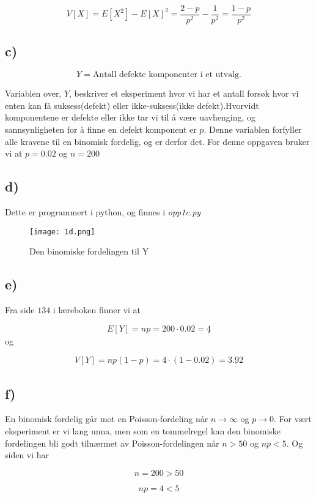 \documentclass[a4paper,norsk, 10pt]{article}
\begin{document}
$$
V[X] = E[X^2] - E[X]^2 = \frac{2-p}{p^2} - \frac{1}{p^2} = \frac{1-p}{p^2}
$$


\subsection*{c)}

$$
Y = \text{Antall defekte komponenter i et utvalg.}
$$

Variablen over, $Y$, beskriver et eksperiment hvor vi har et antall forsøk hvor vi enten kan få suksess(defekt) eller ikke-suksess(ikke defekt).Hvorvidt komponentene er defekte eller ikke tar vi til å være uavhenging, og sannsynligheten for å finne en defekt komponent er $p$. Denne variablen forfyller alle kravene til en binomisk fordelig, og er derfor det. For denne oppgaven bruker vi at $p = 0.02$ og $n = 200$

\subsection*{d)}

Dette er programmert i python, og finnes i \textit{opp1c.py}

\begin{figure}[H]
\centering
\texttt{[image: 1d.png]}
\caption{Den binomiske fordelingen til Y}
\end{figure}

\subsection*{e)}

Fra side $134$ i læreboken finner vi at

$$
E[Y] = np = 200\cdot 0.02 = \underline{\underline{4}}
$$
og

$$
V[Y] = np(1-p) = 4\cdot(1-0.02) = \underline{\underline{3.92}}
$$

\subsection*{f)}

En binomisk fordelig går mot en Poisson-fordeling når $n \rightarrow \infty$ og $p \rightarrow 0$. For vært eksperiment er vi lang unna, men som en tommelregel kan den binomiske fordelingen bli godt tilnærmet av Poisson-fordelingen når $n > 50$ og $np < 5$. Og siden vi har 

$$
n = 200 > 50
$$

$$
np = 4 < 5
$$
\end{document}
